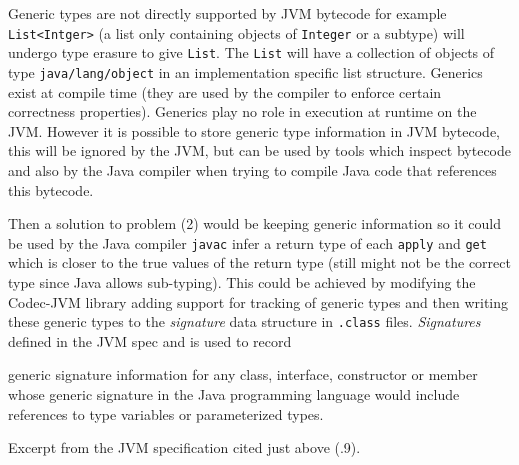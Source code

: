 \documentclass[float=false, crop=false]{standalone}
\begin{document}
Generic types are not directly supported by JVM bytecode for example
\verb|List<Intger>| (a list only containing objects of \verb|Integer| or a subtype)
will undergo type erasure to give \verb|List|. The \verb|List| 
will have a collection of objects of type \verb|java/lang/object| in an implementation
specific list structure. 
Generics exist at compile time (they are used by the compiler to enforce 
certain correctness properties). Generics play no role in execution at runtime
on the JVM. However it is possible to store generic type information
in JVM bytecode, this will be ignored by the JVM, but can be used by tools
which inspect bytecode and also by the Java compiler when trying to compile
Java code that references this bytecode.

Then a solution to problem (2) would be keeping generic information so it 
could be used by the Java compiler \texttt{javac} infer a return type of 
each \texttt{apply} and \texttt{get} which is closer to the true 
values of the return type (still might not be the correct type 
since Java allows sub-typing). 
This could be achieved by modifying the Codec-JVM library 
\cite{codec-jvm-link} adding support for tracking of generic types and then 
writing these generic types to the \textit{signature} data structure in 
\verb|.class| files. \textit{Signatures} defined in the JVM spec
\cite[.9]{jvm-spec8} and is used to record
\begin{displayquote}
  generic signature information for any class, interface, 
  constructor or member whose generic signature in the Java 
  programming language would include references to type variables 
  or parameterized types.
\end{displayquote}
\begin{flushright}
Excerpt from the JVM specification cited just above (.9).
\end{flushright}
\end{document}
